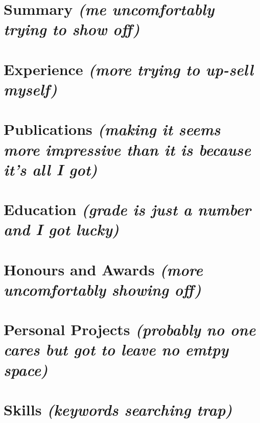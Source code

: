 \documentclass[english,a4paper,10pt]{extarticle}
\begin{document}
\pagestyle{normal_page}
\thispagestyle{first_page}

\section{Summary \hfill {\itshape \scriptsize (me uncomfortably trying to show off)}} 


\section{Experience \hfill {\itshape \scriptsize (more trying to up-sell myself)}}


\section{Publications \hfill {\itshape \scriptsize (making it seems more impressive than
it is because it's all I got)}}


\section{Education \hfill {\itshape \scriptsize (grade is just a number and I got lucky)}}


\section{Honours and Awards \hfill {\itshape \scriptsize (more uncomfortably showing off)}}


\section{Personal Projects \hfill {\itshape \scriptsize (probably no one cares but got
to leave no emtpy space)}}


\section{Skills \hfill {\itshape \scriptsize (keywords searching trap)}}


\thispagestyle{last_page}

\end{document}
